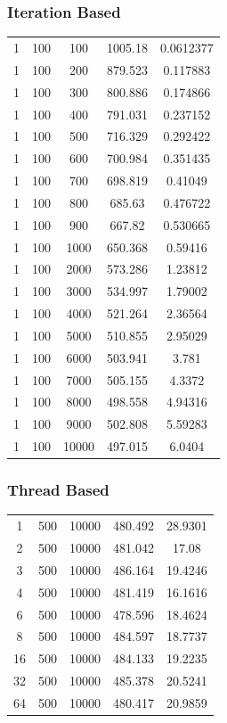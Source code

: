 \documentclass[10pt,letterpaper]{article}
\begin{document}
\subsubsection{Iteration Based}
\begin{tabular}{ c | c | c | c | c }
 1 & 100 & 100 & 1005.18 & 0.0612377 \\
 1 & 100 & 200 & 879.523 & 0.117883 \\
 1 & 100 & 300 & 800.886 & 0.174866 \\
 1 & 100 & 400 & 791.031 & 0.237152 \\
 1 & 100 & 500 & 716.329 & 0.292422 \\
 1 & 100 & 600 & 700.984 & 0.351435 \\
 1 & 100 & 700 & 698.819 & 0.41049 \\
 1 & 100 & 800 & 685.63 & 0.476722 \\
 1 & 100 & 900 & 667.82 & 0.530665 \\
 1 & 100 & 1000 & 650.368 & 0.59416 \\
 1 & 100 & 2000 & 573.286 & 1.23812 \\
 1 & 100 & 3000 & 534.997 & 1.79002 \\
 1 & 100 & 4000 & 521.264 & 2.36564 \\
 1 & 100 & 5000 & 510.855 & 2.95029 \\
 1 & 100 & 6000 & 503.941 & 3.781 \\
 1 & 100 & 7000 & 505.155 & 4.3372 \\
 1 & 100 & 8000 & 498.558 & 4.94316 \\
 1 & 100 & 9000 & 502.808 & 5.59283 \\
 1 & 100 & 10000 & 497.015 & 6.0404 \\
\end{tabular}

\subsubsection{Thread Based}
\begin{tabular}{ c | c | c | c | c }
1 & 500 & 10000 & 480.492 & 28.9301 \\
2 & 500 & 10000 & 481.042 & 17.08 \\
3 & 500 & 10000 & 486.164 & 19.4246 \\
4 & 500 & 10000 & 481.419 & 16.1616 \\
6 & 500 & 10000 & 478.596 & 18.4624 \\
8 & 500 & 10000 & 484.597 & 18.7737 \\
16 & 500 & 10000 & 484.133 & 19.2235 \\
32 & 500 & 10000 & 485.378 & 20.5241 \\
64 & 500 & 10000 & 480.417 & 20.9859 \\
\end{tabular}
\end{document}
